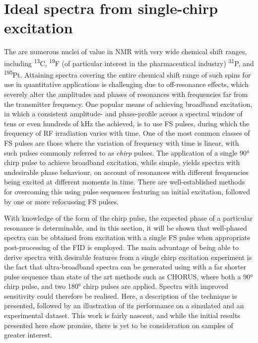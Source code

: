 \section{Ideal spectra from single-chirp excitation}
\label{sec:bbqchili}

The are numerous nuclei of value in \ac{NMR} with very wide chemical shift
ranges, including \textsuperscript{13}C, \textsuperscript{19}F (of
particular interest in the pharmaceutical industry) \textsuperscript{31}P, and
\textsuperscript{195}Pt.
Attaining spectra covering the entire chemical shift range of such spins for
use in quantitative applications is challenging due to off-resonance effects,
which severely alter the amplitudes and phases of resonances with frequencies
far from the transmitter frequency\cite[Section 3.4.1]{Cavanagh2007}. One
popular means of achieving broadband excitation, in which a consistent
amplitude- and phase-profile across a spectral window of tens or even hundreds
of \unit{\kilo\hertz} the achieved, is to use \ac{FS} pulses, during
which the frequency of \ac{RF} irradiation varies with
time\cite{Foroozandeh2020}. One of the most common classes of \ac{FS} pulses
are those where the variation of frequency with time is linear, with such
pulses commonly referred to as \emph{chirp} pulses. The application of a single
\ang{90} chirp pulse to achieve broadband excitation, while simple, yields
spectra with undesirable phase behaviour, on account of resonances with
different frequencies being excited at different moments in time.
There are well-established methods for overcoming this using
pulse sequences featuring an initial excitation, followed by one or more
refocussing \ac{FS}
pulses\cite{Bohlen1989,Bohlen1993,Cano2002,Power2016,Foroozandeh2019}.

With knowledge of the form of the chirp pulse, the expected phase of a
particular resonance is determinable, and in this section, it will be shown
that well-phased spectra can be obtained from excitation with a single \ac{FS}
pulse when appropriate post-processing of the \ac{FID} is employed.
The main advantage of being able to derive spectra with desirable features from
a single chirp excitation experiment is the fact that ultra-broadband spectra
can be generated using with a far shorter pulse sequence than state of the art
methods such as \ac{CHORUS}\cite{Power2016,Foroozandeh2019}, where both a
\ang{90} chirp pulse, and two \ang{180} chirp pulses are applied. Spectra with
improved sensitivity could therefore be realised.  Here, a description of the
technique is presented, followed by an illustration of its performance on a
simulated and an experimental dataset. This work is fairly nascent, and while
the initial results presented here show promise, there is yet to be
consideration on samples of greater interest.

